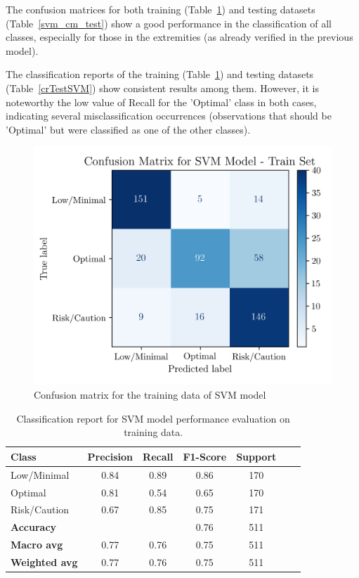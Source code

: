 \documentclass[conference]{IEEEtran}
\begin{document}
The confusion matrices for both training (Table~\ref{svm_cm_train}) and  testing datasets (Table~\ref{svm_cm_test}) show a good performance in the classification of all classes, especially for those in the extremities (as already verified in the previous model).

The classification reports of the training (Table~\ref{crTrainSVM}) and testing datasets (Table~\ref{crTestSVM}) show consistent results among them. However, it is noteworthy the low value of Recall for the 'Optimal' class in both cases, indicating several misclassification occurrences (observations that should be 'Optimal' but were classified as one of the other classes). 

\begin{figure}[H]
    \centering
    \includegraphics[width=1\linewidth]{assets/SVM_ConfusionMatrixTrain.png}
    \caption{Confusion matrix for the training data of SVM model}
    \label{svm_cm_train}
\end{figure} %

\begin{table}[H]
\centering
\caption{Classification report for SVM model performance evaluation on training data.}
\label{crTrainSVM}
\begin{tabular}{lcccccc}
\toprule
\textbf{Class} & \textbf{Precision} & \textbf{Recall} & \textbf{F1-Score} & \textbf{Support} \\
\midrule
Low/Minimal & 0.84 & 0.89 & 0.86 & 170 \\
Optimal & 0.81 & 0.54 & 0.65 & 170 \\
Risk/Caution & 0.67 & 0.85 & 0.75 & 171 \\
\midrule
\textbf{Accuracy} &  &  & 0.76 & 511 \\
\textbf{Macro avg} & 0.77 & 0.76 & 0.75 & 511 \\
\textbf{Weighted avg} & 0.77 & 0.76 & 0.75 & 511 \\
\bottomrule
\end{tabular}
\end{table} %
\end{document}
